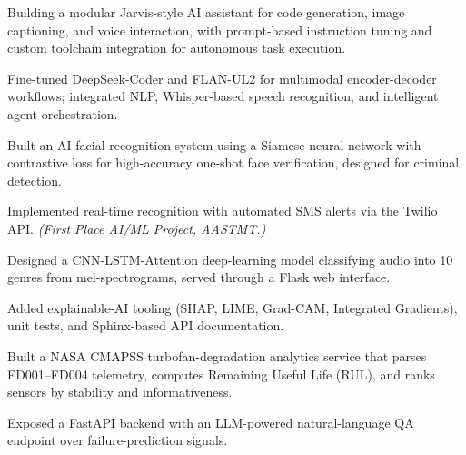 \documentclass[a4paper,10pt]{article}
\begin{document}

\begin{cvitems}
  \item Building a modular Jarvis-style AI assistant for code generation, image
        captioning, and voice interaction, with prompt-based instruction tuning
        and custom toolchain integration for autonomous task execution.
  \item Fine-tuned DeepSeek-Coder and FLAN-UL2 for multimodal encoder-decoder
        workflows; integrated NLP, Whisper-based speech recognition, and
        intelligent agent orchestration.
\end{cvitems}

\begin{cvitems}
  \item Built an AI facial-recognition system using a Siamese neural network with
        contrastive loss for high-accuracy one-shot face verification, designed
        for criminal detection.
  \item Implemented real-time recognition with automated SMS alerts via the
        Twilio API. \textit{(First Place AI/ML Project, AASTMT.)}
\end{cvitems}

\begin{cvitems}
  \item Designed a CNN-LSTM-Attention deep-learning model classifying audio into
        10 genres from mel-spectrograms, served through a Flask web interface.
  \item Added explainable-AI tooling (SHAP, LIME, Grad-CAM, Integrated
        Gradients), unit tests, and Sphinx-based API documentation.
\end{cvitems}

\begin{cvitems}
  \item Built a NASA CMAPSS turbofan-degradation analytics service that parses
        FD001--FD004 telemetry, computes Remaining Useful Life (RUL), and ranks
        sensors by stability and informativeness.
  \item Exposed a FastAPI backend with an LLM-powered natural-language QA
        endpoint over failure-prediction signals.
\end{cvitems}
\end{document}
